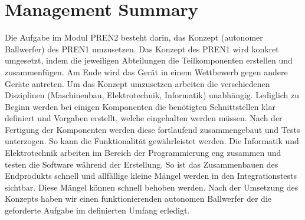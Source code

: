 \section*{Management Summary}
Die Aufgabe im Modul PREN2 besteht darin, das Konzept 
(autonomer Ballwerfer) des PREN1 umzusetzen. Das Konzept
des PREN1 wird konkret umgesetzt, indem die jeweiligen
Abteilungen die Teilkomponenten erstellen und zusammenfügen.
Am Ende wird das Gerät in einem Wettbewerb gegen andere
Geräte antreten. Um das Konzept umzusetzen arbeiten die 
verschiedenen Disziplinen (Maschinenbau, Elektrotechnik, Informatik) 
unabhängig. Lediglich zu Beginn werden bei einigen Komponenten die 
benötigten Schnittstellen klar definiert und Vorgaben erstellt,
welche eingehalten werden müssen. Nach der Fertigung der
Komponenten werden diese fortlaufend zusammengebaut und Tests 
unterzogen. So kann die Funktionalität gewährleistet werden. 
Die Informatik und Elektrotechnik arbeiten im Bereich der 
Programmierung eng zusammen und testen die Software während 
der Erstellung. So ist das Zusammenbauen des Endprodukts schnell 
und allfällige kleine Mängel werden in den Integrationstests 
sichtbar. Diese Mängel können schnell behoben werden. Nach der 
Umsetzung des Konzepts haben wir einen funktionierenden 
autonomen Ballwerfer der die geforderte Aufgabe im definierten 
Umfang erledigt.
